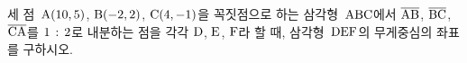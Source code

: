 세 점~$\mathrm{A}(10{,}\mkern3mu\mathopen{}5)$, $\mathrm{B}(-2{,}\mkern3mu\mathopen{}2)$, $\mathrm{C}(4{,}\mkern3mu\mathopen{}-1)$을 꼭짓점으로 하는 삼각형~$\mathrm{ABC}$에서 $\overline{\mathrm{AB}}$, $\overline{\mathrm{BC}}$, $\overline{\mathrm{CA}}$를 $1\mkern3mu :\mkern3mu 2$로 내분하는 점을 각각 $\mathrm{D}$, $\mathrm{E}$, $\mathrm{F}$라 할 때, 삼각형~$\mathrm{DEF}$의 무게중심의 좌표를 구하시오.
